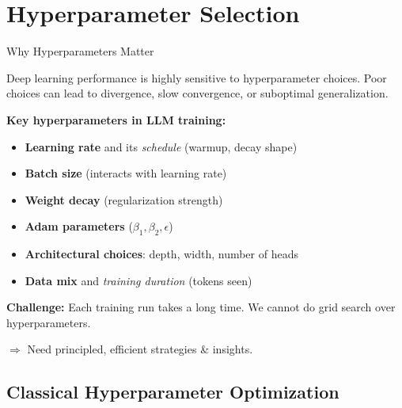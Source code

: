 
\section{Hyperparameter Selection}

\begin{frame}{Why Hyperparameters Matter}

  Deep learning performance is highly sensitive to hyperparameter choices.
  Poor choices can lead to divergence, slow convergence, or suboptimal generalization.

  \vspace{0.5em}
  \textbf{Key hyperparameters in LLM training:}
  \begin{itemize}
    \item \textbf{Learning rate} and its \emph{schedule} (warmup, decay shape)
    \item \textbf{Batch size} (interacts with learning rate)
    \item \textbf{Weight decay} (regularization strength)
    \item \textbf{Adam parameters} ($\beta_1, \beta_2, \epsilon$)
    \item \textbf{Architectural choices}: depth, width, number of heads
    \item \textbf{Data mix} and \emph{training duration} (tokens seen)
  \end{itemize}

  \vspace{0.5em}
  \textbf{Challenge:} Each training run takes a long time.
  We cannot do grid search over hyperparameters.

  \vspace{0.3em}
  $\Rightarrow$ Need principled, efficient strategies \& insights.
\end{frame}

\subsection{Classical Hyperparameter Optimization}

